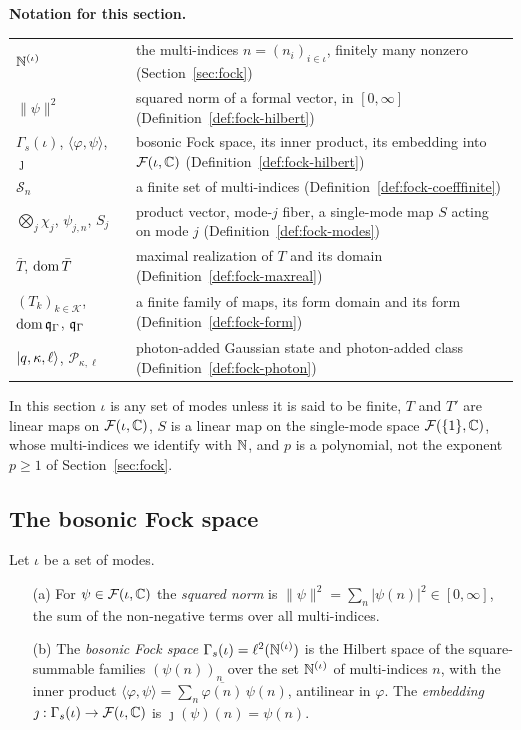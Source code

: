 \begin{vetbenv}
\medskip
\noindent\textbf{Notation for this section.}
\begin{center}
\begin{tabular}{@{}L{0.3\textwidth}L{0.64\textwidth}@{}}
$\mathbb N^{(\iota)}$ & the multi-indices $n=(n_i)_{i\in\iota}$, finitely many nonzero (Section~\ref{sec:fock})\\
$\lVert\psi\rVert^2$ & squared norm of a formal vector, in $[0,\infty]$ (Definition~\ref{def:fock-hilbert})\\
$\Gamma_s(\iota)$, $\langle\varphi,\psi\rangle$, $\jmath$ & bosonic Fock space, its inner product, its
embedding into $\mathcal F(\iota,\mathbb C)$ (Definition~\ref{def:fock-hilbert})\\
$\mathcal S_n$ & a finite set of multi-indices (Definition~\ref{def:fock-coefffinite})\\
$\bigotimes_j\chi_j$, $\psi_{j,n}$, $S_j$ & product vector, mode-$j$ fiber, a single-mode map $S$ acting
on mode $j$ (Definition~\ref{def:fock-modes})\\
$\bar T$, $\operatorname{dom}\bar T$ & maximal realization of $T$ and its domain (Definition~\ref{def:fock-maxreal})\\
$(T_k)_{k\in\mathcal K}$, $\operatorname{dom}\mathfrak q_\Gamma$, $\mathfrak q_\Gamma$ & a finite family of maps, its form domain and
its form (Definition~\ref{def:fock-form})\\
$\lvert q,\kappa,\ell\rangle$, $\mathcal P_{\kappa,\ell}$ & photon-added Gaussian state and photon-added class
(Definition~\ref{def:fock-photon})\\
\end{tabular}
\end{center}
In this section $\iota$ is any set of modes unless it is said to be finite, $T$ and $T'$ are linear
maps on $\mathcal F(\iota,\mathbb C)$, $S$ is a linear map on the single-mode space $\mathcal F(\{1\},\mathbb C)$, whose
multi-indices we identify with $\mathbb N$, and $p$ is a polynomial, not the exponent $p\ge1$ of
Section~\ref{sec:fock}.

\subsection{The bosonic Fock space}

\begin{definition}\label{def:fock-hilbert}
Let $\iota$ be a set of modes.
\begin{enumerate}
\item[(a)] For $\psi\in\mathcal F(\iota,\mathbb C)$ the \emph{squared norm} is $\lVert\psi\rVert^2=\sum_n\lvert
\psi(n)\rvert^2\in[0,\infty]$, the sum of the non-negative terms over all multi-indices.
\item[(b)] The \emph{bosonic Fock space} $\Gamma_s(\iota)=\ell^2(\mathbb N^{(\iota)})$ is the Hilbert space of
the square-summable families $(\psi(n))_n$ over the set $\mathbb N^{(\iota)}$ of multi-indices $n$, with the inner
product $\langle\varphi,\psi\rangle=\sum_n\overline{\varphi(n)}\,\psi(n)$, antilinear in $\varphi$. The
\emph{embedding} $\jmath:\Gamma_s(\iota)\to\mathcal F(\iota,\mathbb C)$ is $\jmath(\psi)(n)=\psi(n)$.
\end{enumerate}
\end{definition}


\end{vetbenv}
